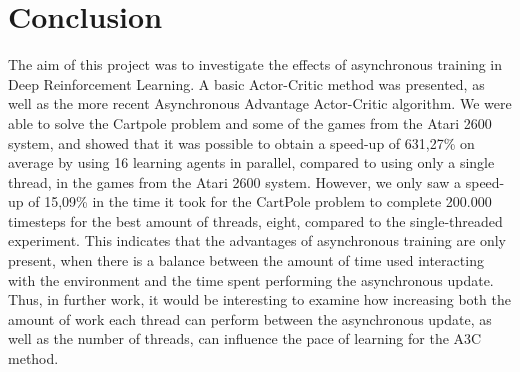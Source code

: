 \documentclass[11pt]{article}
\begin{document}
\section{Conclusion}

The aim of this project was to investigate the effects of asynchronous
training in Deep Reinforcement Learning.
A basic Actor-Critic method was presented,
as well as the more recent Asynchronous Advantage Actor-Critic algorithm.
We were able to solve the Cartpole problem and some of the games from the
Atari 2600 system, and showed that it was possible to obtain a
speed-up of 631,27\% on average by using 16 learning agents in parallel, compared to
using only a single thread, in the games from the Atari 2600 system.
However, we only saw a speed-up of 15,09\% in the time it took for the CartPole problem
to complete 200.000 timesteps for the best amount of threads, eight, compared to the
single-threaded experiment.
This indicates that the advantages of asynchronous training are only present, when
there is a balance between the amount of time used interacting with the environment
and the time spent performing the asynchronous update.
Thus, in further work, it would be interesting to examine how increasing both the
amount of work each thread can perform between the asynchronous update, as
well as the number of threads, can influence the pace of learning for the A3C method.
\end{document}
